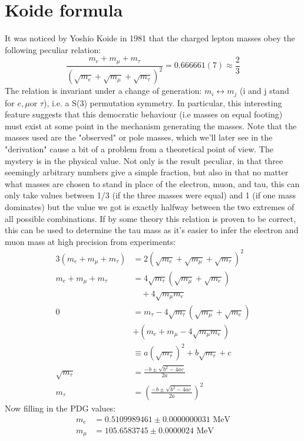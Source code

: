 \documentclass[twoside,twocolumn,11pt]{article} %
\begin{document}
\section{Koide formula}
It was noticed by Yoshio Koide in 1981 that the charged lepton masses obey the following peculiar relation:
\begin{equation}
	\frac{m_{e}+m_{\mu}+m_{\tau}}{\left(\sqrt{m_{e}}+\sqrt{m_{\mu}}+\sqrt{m_{\tau}}\right)^{2}}=0.666661(7) \approx \frac{2}{3} \label{eq:KoideFormula}
\end{equation}
The relation is invariant under a change of generation: $m_i \leftrightarrow m_j$ (i and j stand for $e, \mu$or $\tau$), i.e. a S(3) permutation symmetry. In particular, this interesting feature suggests that this democratic behaviour (i.e masses on equal footing) must exist at some point in the mechanism generating the masses.
Note that the masses used are the "observed" or pole masses, which we'll later see in the "derivation" cause a bit of a problem from a theoretical point of view. The mystery is in the physical value. Not only is the result peculiar, in that three seemingly arbitrary numbers give a simple fraction, but also in that no matter what masses are chosen to stand in place of the electron, muon, and tau, this can only take values between 1/3  (if the three masses were equal) and 1 (if one mass dominates) but the value we got is exactly halfway between the two extremes of all possible combinations.  If by some theory this relation is proven to be correct, this can be used to determine the tau mass as it's easier to infer the electron and muon mass at high precision from experiments:
\begin{align*}
	3(m_e + m_\mu + m_\tau) &= 2(\sqrt{m_e} + \sqrt{m_\mu} + \sqrt{m_\tau})^2\\
	m_e + m_\mu + m_\tau &= 4\sqrt{m_\tau}(\sqrt{m_\mu} + \sqrt{m_e})\\ &\quad+ 4\sqrt{m_\mu m_e}\\
	0&= m_\tau - 4\sqrt{m_\tau}(\sqrt{m_\mu} + \sqrt{m_e})\\ &+ (m_e + m_\mu - 4\sqrt{m_\mu m_e})\\
	&\equiv a(\sqrt{m_\tau})^2 + b\sqrt{m_\tau} + c\\
	\sqrt{m_\tau} &= \frac{-b \pm \sqrt{b^2 - 4ac}}{2a}\\
	m_\tau &= \left( \frac{-b \pm \sqrt{b^2 - 4ac}}{2a}\right)^2
\end{align*}
Now filling in the PDG\cite{PDG} values:
\begin{align*}
	m_e &= 0.5109989461\pm 0.0000000031 \text{ MeV} \\ m_\mu &= 105.6583745 \pm 0.0000024 \text{ MeV}
\end{align*}
\end{document}
